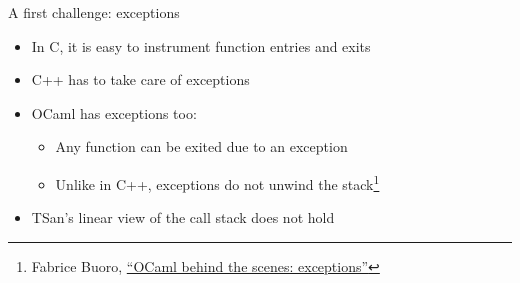 \begin{frame}{A first challenge: exceptions}
  \begin{itemize}
    \item In C, it is easy to instrument function entries and exits
    \item C++ has to take care of exceptions
    \item OCaml has exceptions too:
      \begin{itemize}
        \item Any function can be exited due to an exception
        \item Unlike in C++, exceptions do not unwind the
          stack\footnote[frame]{Fabrice Buoro,
          \href{https://github.com/fabbing/obts_exn}{``OCaml behind the scenes:
        exceptions''}}
      \end{itemize}
  \end{itemize}

  \begin{itemize}
    \item TSan's linear view of the call stack does not hold
  \end{itemize}
\end{frame}


\newcommand\exnDiagram[1]{%
  \providecommand\step{#1}%
}

